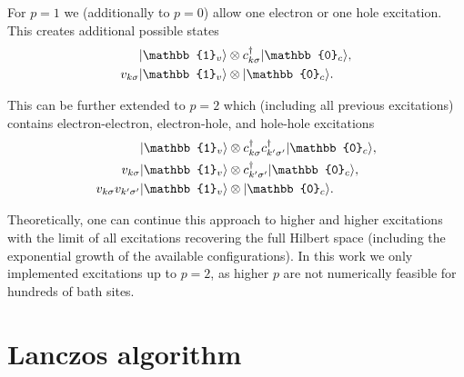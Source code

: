 For $p=1$ we (additionally to $p=0$) allow one electron or one hole excitation.
This creates additional possible states
\begin{subequations}
    \begin{align}
        \ket{\mathbb{1}_v}             & \otimes c^\dag_{k\sigma} \ket{\mathbb{0}_c}, \\
        v_{k\sigma} \ket{\mathbb{1}_v} & \otimes \ket{\mathbb{0}_c}.
    \end{align}%
\end{subequations}

This can be further extended to $p=2$ which
(including all previous excitations)
contains electron-electron, electron-hole, and hole-hole excitations
\begin{subequations}
    \begin{align}
        \ket{\mathbb{1}_v}                           & \otimes c^\dag_{k\sigma} c^\dag_{k'\sigma'} \ket{\mathbb{0}_c}, \\
        v_{k\sigma} \ket{\mathbb{1}_v}               & \otimes c^\dag_{k'\sigma'} \ket{\mathbb{0}_c},                  \\
        v_{k\sigma} v_{k'\sigma'} \ket{\mathbb{1}_v} & \otimes \ket{\mathbb{0}_c}.
    \end{align}%
\end{subequations}

Theoretically, one can continue this approach to higher and higher excitations
with the limit of all excitations recovering the full Hilbert space
(including the exponential growth of the available configurations).
In this work we only implemented excitations up to $p=2$,
as higher $p$ are not numerically feasible for hundreds of bath sites.

\section{Lanczos algorithm}%
\label{sec:Lanczos-algorithm}

